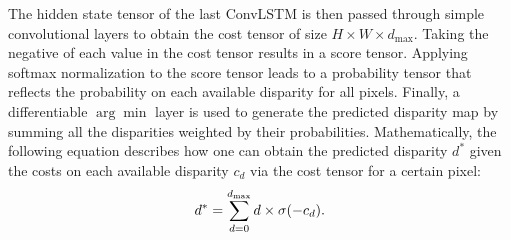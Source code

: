 \documentclass[10pt,twocolumn,letterpaper]{article}
\begin{document}
The hidden state tensor of the last ConvLSTM is then passed through simple convolutional layers to obtain the cost tensor of size $H \times W \times d_{\max} $. Taking the negative of each value in the cost tensor results in a score tensor. Applying  softmax normalization to the score tensor leads to a probability tensor that reflects the probability on each available disparity for all  pixels. Finally, a differentiable $\arg\min$ layer \cite{kendall2017end} is used to generate the predicted disparity map by summing all the disparities weighted by their probabilities. Mathematically, the following equation describes how one can obtain the predicted disparity $d^{*}$ given the costs on each available disparity $c_{d}$ via the cost tensor for a certain pixel:
\begin{equation}
\vspace{-0.3cm}
d^{*} = \sum_{d=0}^{d_{\max}}d\times\sigma(-c_{d}).
\label{eq:eq2}
\vspace{-0.2cm}
\end{equation}
\end{document}
